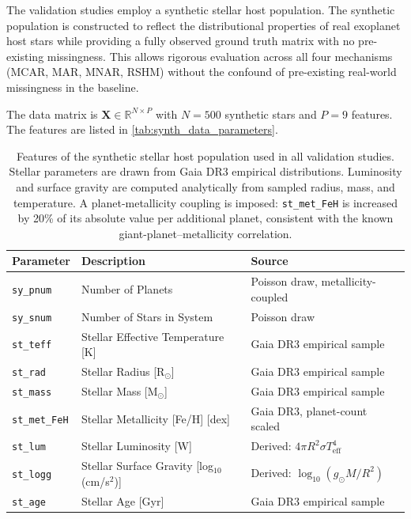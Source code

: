 \documentclass[preprint,longauthor,twocolumn]{aastex631}
\begin{document}
The validation studies employ a synthetic stellar host population. The synthetic population is constructed to reflect the distributional properties of real exoplanet host stars while providing a fully observed ground truth matrix with no pre-existing missingness. This allows rigorous evaluation across all four mechanisms (MCAR, MAR, MNAR, RSHM) without the confound of pre-existing real-world missingness in the baseline.

The data matrix is $\mathbf{X} \in \mathbb{R}^{N \times P}$ with $N = 500$ synthetic stars and $P = 9$ features. The features are listed in \autoref{tab:synth_data_parameters}.

\begin{table}
  \centering
  \begin{tabular}{lll}
    \hline
    \textbf{Parameter} & \textbf{Description} & \textbf{Source} \\
    \hline
    \verb|sy_pnum| & Number of Planets & Poisson draw, metallicity-coupled \\
    \verb|sy_snum| & Number of Stars in System & Poisson draw \\
    \verb|st_teff| & Stellar Effective Temperature [K] & Gaia DR3 empirical sample \\
    \verb|st_rad|  & Stellar Radius [R$_\odot$] & Gaia DR3 empirical sample \\
    \verb|st_mass| & Stellar Mass [M$_\odot$] & Gaia DR3 empirical sample \\
    \verb|st_met_FeH| & Stellar Metallicity [Fe/H] [dex] & Gaia DR3, planet-count scaled \\
    \verb|st_lum|  & Stellar Luminosity [W] & Derived: $4\pi R^2 \sigma T_{\text{eff}}^4$ \\
    \verb|st_logg| & Stellar Surface Gravity [log$_{10}$(cm/s$^2$)] & Derived: $\log_{10}(g_\odot M/R^2)$ \\
    \verb|st_age|  & Stellar Age [Gyr] & Gaia DR3 empirical sample \\
    \hline
  \end{tabular}
  \caption{Features of the synthetic stellar host population used in all validation studies. Stellar parameters are drawn from Gaia DR3 empirical distributions. Luminosity and surface gravity are computed analytically from sampled radius, mass, and temperature. A planet-metallicity coupling is imposed: \texttt{st\_met\_FeH} is increased by 20\% of its absolute value per additional planet, consistent with the known giant-planet--metallicity correlation.}
  \label{tab:synth_data_parameters}
\end{table}
\end{document}
